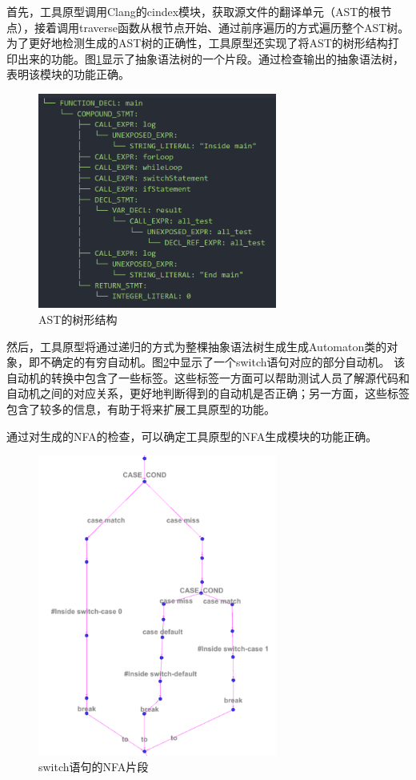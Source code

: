 首先，工具原型调用Clang的cindex模块，获取源文件的翻译单元（AST的根节点），接着调用traverse函数从根节点开始、通过前序遍历的方式遍历整个AST树。为了更好地检测生成的AST树的正确性，工具原型还实现了将AST的树形结构打印出来的功能。图\ref{fig:testAST}显示了抽象语法树的一个片段。通过检查输出的抽象语法树，表明该模块的功能正确。
\begin{figure}[htbp]
	\centering	\includegraphics[width=0.7\textwidth]{pictures/testAST.png}
	\caption{AST的树形结构}
	\label{fig:testAST}
\end{figure}


然后，工具原型将通过递归的方式为整棵抽象语法树生成生成Automaton类的对象，即不确定的有穷自动机。图\ref{fig:switch语句的NFA片段}中显示了一个switch语句对应的部分自动机。
该自动机的转换中包含了一些标签。这些标签一方面可以帮助测试人员了解源代码和自动机之间的对应关系，更好地判断得到的自动机是否正确；另一方面，这些标签包含了较多的信息，有助于将来扩展工具原型的功能。

通过对生成的NFA的检查，可以确定工具原型的NFA生成模块的功能正确。

\begin{figure}[ht]
	\centering
\includegraphics[width=0.7\textwidth]{pictures/switch语句的NFA片段.png}
	\caption{switch语句的NFA片段}
	\label{fig:switch语句的NFA片段}
\end{figure}

